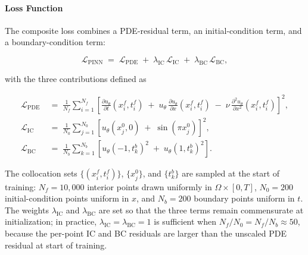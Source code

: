 \documentclass[11pt,a4paper]{report}
\begin{document}
\paragraph{Loss Function}
The composite loss combines a PDE-residual term, an initial-condition term, and a boundary-condition term:

\begin{equation}
\label{eq:burgers_loss}
\mathcal{L}_{\mathrm{PINN}} \;=\; \mathcal{L}_{\mathrm{PDE}} \;+\; \lambda_{\mathrm{IC}}\,\mathcal{L}_{\mathrm{IC}} \;+\; \lambda_{\mathrm{BC}}\,\mathcal{L}_{\mathrm{BC}},
\end{equation}

with the three contributions defined as

\begin{equation}
\label{eq:burgers_components}
\begin{aligned}
\mathcal{L}_{\mathrm{PDE}} &\;=\; \frac{1}{N_{f}} \sum_{i=1}^{N_{f}}
\left[
\frac{\partial u_{\theta}}{\partial t}(x_{i}^{f}, t_{i}^{f}) \;+\; u_{\theta}\,\frac{\partial u_{\theta}}{\partial x}(x_{i}^{f}, t_{i}^{f}) \;-\; \nu\,\frac{\partial^{2} u_{\theta}}{\partial x^{2}}(x_{i}^{f}, t_{i}^{f})
\right]^{2}, \\[1ex]
\mathcal{L}_{\mathrm{IC}} &\;=\; \frac{1}{N_{0}} \sum_{j=1}^{N_{0}}
\left[ u_{\theta}(x_{j}^{0}, 0) \;+\; \sin(\pi x_{j}^{0}) \right]^{2}, \\[1ex]
\mathcal{L}_{\mathrm{BC}} &\;=\; \frac{1}{N_{b}} \sum_{k=1}^{N_{b}}
\left[ u_{\theta}(-1, t_{k}^{b})^{2} \;+\; u_{\theta}(1, t_{k}^{b})^{2} \right].
\end{aligned}
\end{equation}

The collocation sets $\{(x_{i}^{f}, t_{i}^{f})\}$, $\{x_{j}^{0}\}$, and $\{t_{k}^{b}\}$ are sampled at the start of training: $N_{f} = 10{,}000$ interior points drawn uniformly in $\Omega \times [0,T]$, $N_{0} = 200$ initial-condition points uniform in $x$, and $N_{b} = 200$ boundary points uniform in $t$. The weights $\lambda_{\mathrm{IC}}$ and $\lambda_{\mathrm{BC}}$ are set so that the three terms remain commensurate at initialization; in practice, $\lambda_{\mathrm{IC}} = \lambda_{\mathrm{BC}} = 1$ is sufficient when $N_{f}/N_{0} = N_{f}/N_{b} \approx 50$, because the per-point IC and BC residuals are larger than the unscaled PDE residual at start of training.
\end{document}
